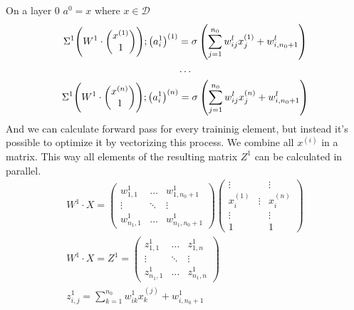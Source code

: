 \documentclass[draft]{article}
\begin{document}
On a layer 0 $a^0 = x$ where $x \in \mathcal{D}$
\begin{gather}
\Sigma^1 \Biggl( W^1 \cdot \begin{pmatrix} x^{(1)} \\ 1 \end{pmatrix} \Biggr); 
\bigl(a^1_i\bigr)^{(1)} = \sigma \left( \sum_{j=1}^{n_{0}} w_{ij}^l x_j^{(1)} + w_{i,n_{0}+1}^l \right) \\
\dots \notag \\
\Sigma^1 \Biggl( W^1 \cdot \begin{pmatrix} x^{(n)} \\ 1 \end{pmatrix} \Biggr);
\bigl(a^1_i\bigr)^{(n)} = \sigma \left( \sum_{j=1}^{n_{0}} w_{ij}^l x_j^{(n)} + w_{i,n_{0}+1}^l \right)
\end{gather}
And we can calculate forward pass for every traininig element, 
but instead it's possible to optimize it by vectorizing this process.
We combine all $x^{(i)}$ in a matrix.
This way all elements of the resulting matrix $Z^1$ can be calculated in parallel.
\begin{gather}
W^1 \cdot X = 
\begin{pmatrix}
w^1_{1,1} & \dots & w^1_{1,n_{0}+1} \\
\vdots & \ddots & \vdots \\
w^1_{n_{1},1} & \dots & w^1_{n_{1},n_{0}+1}
\end{pmatrix}
\begin{pmatrix}
\vdots & & \vdots \\
x^{(1)}_i & \vdots & x^{(n)}_i \\
\vdots & & \vdots \\
1 & & 1
\end{pmatrix} \\
W^1 \cdot X = Z^1 = \begin{pmatrix}
z^1_{1,1} & \dots & z^1_{1,n} \\
\vdots & \ddots & \vdots \\
z^1_{n_{1},1} & \dots & z^1_{n_{1},n}
\end{pmatrix} \\
z^1_{i,j} = \sum_{k=1}^{n_{0}} w_{ik}^1 x_k^{(j)} + w_{i,n_{0}+1}^1
\end{gather}
\end{document}
